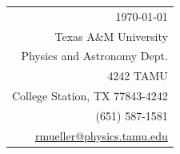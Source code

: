 \documentclass[11pt]{article}
\begin{document}
\hfill%
\begin{tabular}{@{}r@{}}
  \today \\
  [.5em]
Texas A\&M University \\
Physics and Astronomy Dept. \\
4242 TAMU \\
College Station, TX 77843-4242 \\
[.5em]
(651) 587-1581 \\
\href{mailto:rmueller@physics.tamu.edu}{rmueller@physics.tamu.edu}\\
\end{tabular}



\bigskip




\end{document}
